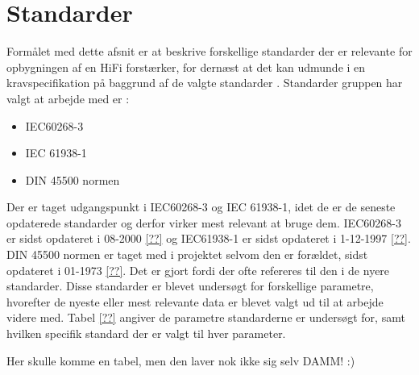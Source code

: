 \chapter{Standarder}
Formålet med dette afsnit er at beskrive forskellige standarder der er relevante for opbygningen af en HiFi forstærker, for dernæst at det kan udmunde i en kravspecifikation på baggrund af de valgte standarder . Standarder gruppen har valgt at arbejde med er :

\begin{itemize}
\item IEC60268-3              
\item IEC 61938-1             
\item DIN 45500 normen    
\end{itemize} 

Der er taget udgangspunkt i IEC60268-3 og IEC 61938-1, idet de er de seneste opdaterede standarder og derfor virker mest relevant at bruge dem. IEC60268-3 er sidst opdateret i 08-2000 \ref{??} og IEC61938-1 er sidst opdateret i 1-12-1997 \ref{??}. DIN 45500 normen er taget med i projektet selvom den er forældet, sidst opdateret i 01-1973 \ref{??}. Det er gjort fordi der ofte refereres til den i de nyere standarder. Disse standarder er blevet undersøgt for forskellige parametre, hvorefter de nyeste eller mest relevante data er blevet valgt ud til at arbejde videre med.
\newline
\newline
Tabel \ref{??} angiver de parametre standarderne er undersøgt for, samt hvilken specifik standard der er valgt til hver parameter.
 
Her skulle komme en tabel, men den laver nok ikke sig selv DAMM! :) 